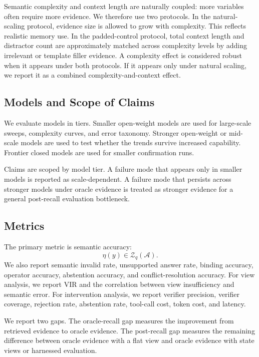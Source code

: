 Semantic complexity and context length are naturally coupled: more variables often require more evidence.
We therefore use two protocols.
In the natural-scaling protocol, evidence size is allowed to grow with complexity.
This reflects realistic memory use.
In the padded-control protocol, total context length and distractor count are approximately matched across complexity levels by adding irrelevant or template filler evidence.
A complexity effect is considered robust when it appears under both protocols.
If it appears only under natural scaling, we report it as a combined complexity-and-context effect.

\subsection{Models and Scope of Claims}
\label{subsec:models-scope}

We evaluate models in tiers.
Smaller open-weight models are used for large-scale sweeps, complexity curves, and error taxonomy.
Stronger open-weight or mid-scale models are used to test whether the trends survive increased capability.
Frontier closed models are used for smaller confirmation runs.

Claims are scoped by model tier.
A failure mode that appears only in smaller models is reported as scale-dependent.
A failure mode that persists across stronger models under oracle evidence is treated as stronger evidence for a general post-recall evaluation bottleneck.

\subsection{Metrics}
\label{subsec:metrics}

The primary metric is semantic accuracy:
\begin{equation}
\eta(y)\in\mathcal Z_q(\mathcal A).
\label{eq:semantic-accuracy}
\end{equation}
We also report semantic invalid rate, unsupported answer rate, binding accuracy, operator accuracy, abstention accuracy, and conflict-resolution accuracy.
For view analysis, we report $\mathrm{VIR}$ and the correlation between view insufficiency and semantic error.
For intervention analysis, we report verifier precision, verifier coverage, rejection rate, abstention rate, tool-call cost, token cost, and latency.

We report two gaps.
The oracle-recall gap measures the improvement from retrieved evidence to oracle evidence.
The post-recall gap measures the remaining difference between oracle evidence with a flat view and oracle evidence with state views or harnessed evaluation.

